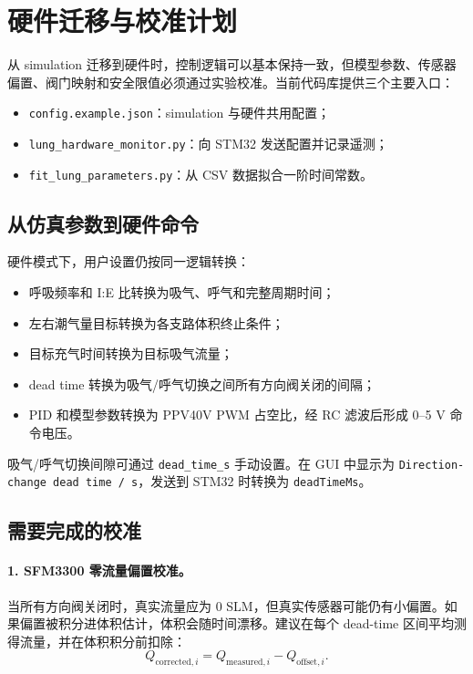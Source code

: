 \documentclass[UTF8,11pt,a4paper]{ctexart}
\begin{document}
\section{硬件迁移与校准计划}

从 simulation 迁移到硬件时，控制逻辑可以基本保持一致，但模型参数、传感器偏置、阀门映射和安全限值必须通过实验校准。当前代码库提供三个主要入口：
\begin{itemize}
  \item \texttt{config.example.json}：simulation 与硬件共用配置；
  \item \texttt{lung\_hardware\_monitor.py}：向 STM32 发送配置并记录遥测；
  \item \texttt{fit\_lung\_parameters.py}：从 CSV 数据拟合一阶时间常数。
\end{itemize}

\subsection{从仿真参数到硬件命令}

硬件模式下，用户设置仍按同一逻辑转换：
\begin{itemize}
  \item 呼吸频率和 I:E 比转换为吸气、呼气和完整周期时间；
  \item 左右潮气量目标转换为各支路体积终止条件；
  \item 目标充气时间转换为目标吸气流量；
  \item dead time 转换为吸气/呼气切换之间所有方向阀关闭的间隔；
  \item PID 和模型参数转换为 PPV40V PWM 占空比，经 RC 滤波后形成 0--5 V 命令电压。
\end{itemize}

吸气/呼气切换间隙可通过 \texttt{dead\_time\_s} 手动设置。在 GUI 中显示为 \texttt{Direction-change dead time / s}，发送到 STM32 时转换为 \texttt{deadTimeMs}。

\subsection{需要完成的校准}

\paragraph{1. SFM3300 零流量偏置校准。}
当所有方向阀关闭时，真实流量应为 0 SLM，但真实传感器可能仍有小偏置。如果偏置被积分进体积估计，体积会随时间漂移。建议在每个 dead-time 区间平均测得流量，并在体积积分前扣除：
\begin{equation}
  Q_{\mathrm{corrected},i}=Q_{\mathrm{measured},i}-Q_{\mathrm{offset},i}.
\end{equation}
\end{document}
